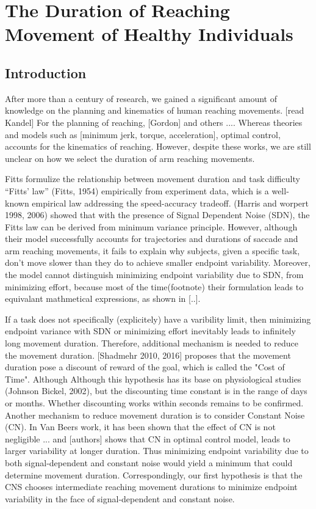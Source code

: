 \chapter{The Duration of Reaching Movement of Healthy Individuals}
\label{cha:ocmd}

\section{Introduction}
After more than a century of research, we gained a significant amount of knowledge on the planning and kinematics of human reaching movements. [read Kandel] For the planning of reaching, [Gordon] and others .... Whereas theories and models such as [minimum jerk, torque, acceleration], optimal control, accounts for the kinematics of reaching. However, despite these works, we are still unclear on how we select the duration of arm reaching movements. 

Fitts formulize the relationship between movement duration and task difficulty  “Fitts’ law” (Fitts, 1954) empirically from experiment data, which is a well-known empirical law addressing the speed-accuracy tradeoff. (Harris and worpert 1998, 2006) showed that with the presence of Signal Dependent Noise (SDN), the Fitts law can be derived from minimum variance principle. However, although their model successfully accounts for trajectories and durations of saccade and arm reaching movements, it fails to explain why subjects, given a specific task, don't move slower than they do to achieve smaller endpoint variability. Moreover, the model cannot distinguish minimizing endpoint variability due to SDN, from minimizing effort, because most of the time(footnote) their formulation leads to equivalant mathmetical expressions, as shown in [..]. 

If a task does not specifically (explicitely) have a varibility limit, then minimizing endpoint variance with SDN or minimizing effort inevitably leads to infinitely long movement duration. Therefore, additional mechanism is needed to reduce the movement duration. [Shadmehr 2010, 2016] proposes that the movement duration pose a discount of reward of the goal, which is called the "Cost of Time". Although Although this hypothesis has its base on physiological studies (Johnson  Bickel, 2002), but the discounting time constant is in the range of days or months. Whether discounting works within seconds remains to be confirmed. Another mechanism to reduce movement duration is to consider Constant Noise (CN). In Van Beers work, it has been shown that the effect of CN is not negligible ... and [authors] shows that CN in optimal control model, leads to larger variability at longer duration. Thus minimizing endpoint variability due to both signal-dependent and constant noise would yield a minimum that could determine movement duration. Correspondingly, our first hypothesis is that the CNS chooses intermediate reaching movement durations to minimize endpoint variability in the face of signal-dependent and constant noise.

